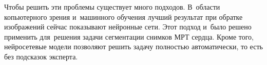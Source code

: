 Чтобы решить эти проблемы существует много подходов. В~области копьютерного зрения и~машинного обучения лучший результат при обратке изображений сейчас показывают нейронные сети. Этот подход и~было решено применить для~решения задачи сегментации снимков МРТ сердца. Кроме того, нейросетевые модели позволяют решить задачу полностью автоматически, то есть без подсказок эксперта.
